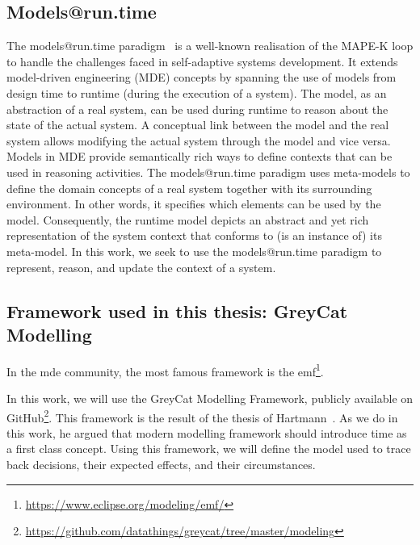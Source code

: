 
\subsection{Models@run.time}
The models@run.time paradigm~\cite{DBLP:journals/computer/MorinBJFS09,DBLP:journals/computer/BlairBF09} is a well-known realisation of the MAPE-K loop to handle the challenges faced in self-adaptive systems development.
It extends model-driven engineering (MDE) concepts by spanning the use of models from design time to runtime (\ie during the execution of a system).
The model, as an abstraction of a real system, can be used during runtime to reason about the state of the actual system. 
A conceptual link between the model and the real system allows modifying the actual system through the model and vice versa.
Models in MDE provide semantically rich ways to define contexts that can be used in reasoning activities. 
The models@run.time paradigm uses meta-models to define the domain concepts of a real system together with its surrounding environment. 
In other words, it specifies which elements can be used by the model.
Consequently, the runtime model depicts an abstract and yet rich representation of the system context that conforms to (is an instance of) its meta-model.
In this work, we seek to use the models@run.time paradigm to represent, reason, and update the context of a system.

\subsection{Framework used in this thesis: GreyCat Modelling}

 
In the \gls{mde} community, the most famous framework is the \gls{emf}\footnote{\url{https://www.eclipse.org/modeling/emf/}}\cite{steinberg2008emf}.



In this work, we will use the GreyCat Modelling Framework, publicly available on GitHub\footnote{\url{https://github.com/datathings/greycat/tree/master/modeling}}.
This framework is the result of the thesis of Hartmann~\cite{}.
As we do in this work, he argued that modern modelling framework should introduce time as a first class concept.
Using this framework, we will define the model used to trace back decisions, their expected effects, and their circumstances.
